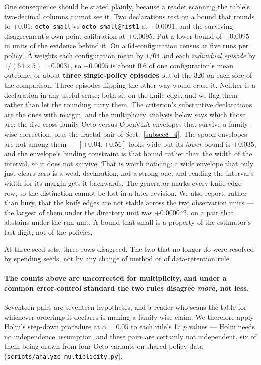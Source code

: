 \documentclass[pdflatex,iicol,sn-apa]{sn-jnl}
\theoremstyle{remark}
\begin{document}
One consequence should be stated plainly, because a reader scanning the table's two-decimal columns
cannot see it. Two declarations rest on a bound that rounds to $+0.01$: \texttt{octo-small} vs
\texttt{octo-small@hist1} at $+0.0091$, and the surviving disagreement's own point calibration at
$+0.0095$. Put a lower bound of $+0.0095$ in units of the evidence behind it. On a 64-configuration
census at five runs per policy, $\hat\Delta$ weights each configuration mean by $1/64$ and each
\emph{individual episode} by $1/(64 \times 5) = 0.0031$, so $+0.0095$ is about $0.6$ of one
configuration's mean outcome, or about \textbf{three single-policy episodes} out of the 320 on each
side of the comparison. Three episodes flipping the other way would erase it.
Neither is a declaration in any useful sense; both sit on the knife edge, and we flag them rather
than let the rounding carry them. The criterion's substantive declarations are the ones with margin,
and the multiplicity analysis below says which those are: the five cross-family Octo-versus-OpenVLA
envelopes that survive a family-wise correction, plus the fractal pair of Sect.~\ref{subsec8_4}. The
spoon envelopes are not among them --- $[+0.04, +0.56]$ looks wide but its \emph{lower} bound is
$+0.035$, and the envelope's binding constraint is that bound rather than the width of the interval,
so it does not survive. That is worth noticing: a wide envelope that only just clears zero is a weak
declaration, not a strong one, and reading the interval's width for its margin gets it backwards. The
generator marks every knife-edge row, so the distinction cannot be lost in a later revision. We also
report, rather than bury, that the knife edges are not stable across the two observation units ---
the largest of them under the directory unit was $+0.000042$, on a pair that abstains under the run
unit. A bound that small is a property of the estimator's last digit, not of the policies.

At three seed sets, three rows disagreed. The two that no longer do were resolved by spending seeds,
not by any change of method or of data-retention rule.

\paragraph{The counts above are uncorrected for multiplicity, and under a common error-control
standard the two rules disagree \emph{more}, not less.}
Seventeen pairs are seventeen hypotheses, and a reader who scans the table for whichever orderings
it declares is making a family-wise claim. We therefore apply Holm's step-down procedure at
$\alpha = 0.05$ to each rule's 17 $p$ values --- Holm needs no independence assumption, and these
pairs are certainly not independent, six of them being drawn from four Octo variants on shared
policy data (\texttt{scripts/analyze\_multiplicity.py}).
\end{document}
